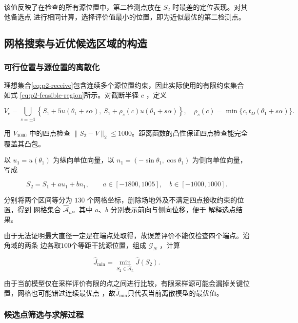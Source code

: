 \documentclass[withoutpreface,bwprint]{cumcmthesis} %
\begin{document}
该值反映了在检查的所有源位置中，第二检测点放在 $S_2$ 时最差的定位表现。对其他备选点
进行相同计算，选择评价值最小的位置，即为近似最优的第二检测点。

\subsection{网格搜索与近优候选区域的构造}

\subsubsection{可行位置与源位置的离散化}

理想集合\eqref{eq:p2-receive}包含连续多个源位置约束，因此实际使用的有限约束集合如式
\eqref{eq:p2-feasible-region}所示。对截断半径 $c$ ，定义

\begin{equation}\label{eq:p2-four}
V_c=\bigcup_{s=\pm1}\left\{S_1+5u(\theta_1+s\alpha),\ 
S_1+\rho_s(c)u(\theta_1+s\alpha)\right\},\quad
\rho_s(c)=\min\{c,t_\Omega(\theta_1+s\alpha)\}.
\end{equation}

用 $V_{1000}$ 中的四点检查 $\|S_2-V\|_2\le1000$。距离函数的凸性保证四点检查能完全覆盖其凸包。

以 $u_1=u(\theta_1)$ 为纵向单位向量，以 $n_1=(-\sin\theta_1,\cos\theta_1)$ 
为侧向单位向量，写成

\begin{equation}\label{eq:p2-grid}
S_2=S_1+a u_1+b n_1,\qquad
a\in[-1800,1005],\quad b\in[-1000,1000].
\end{equation}

分别将两个区间等分为 $130$ 个网格坐标，删除场地外及不满足四点接收约束的位置，得到
网格集合 $\widehat{\mathcal A}_h$。其中 $a$、$b$ 分别表示前向与侧向位移，便于
解释选点结果。

由于无法证明最大直径一定是在端点处取得，故误差评价不能仅检查四个端点。沿角域的两条
边各取$100$个等距干扰源位置，组成 $\mathcal G_N$ ，计算

\begin{equation}\label{eq:p2-sampled}
\widehat J_{\min}=\min_{S_2\in\widehat{\mathcal A}_h}\widehat J(S_2).
\end{equation}

由于当前模型仅在采样评价有限的点之间进行比较，有限采样源可能会漏掉关键位置，网格也可能错过连续最优点
，故$\widehat J_{\min}$只代表当前离散模型的最优值。

\subsubsection{候选点筛选与求解过程}
\end{document}
